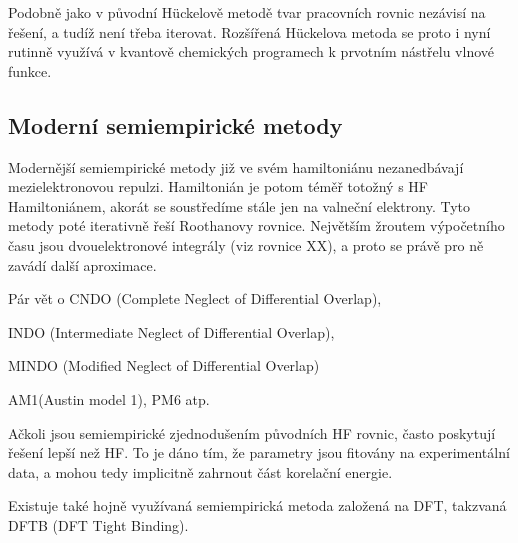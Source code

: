 Podobně jako v původní H\"{u}ckelově metodě tvar pracovních rovnic nezávisí na řešení, a tudíž není třeba iterovat. Rozšířená H\"{u}ckelova metoda se proto i nyní rutinně využívá v kvantově chemických programech k prvotním nástřelu vlnové funkce.

\subsection{Moderní semiempirické metody}

Modernější semiempirické metody již ve svém hamiltoniánu nezanedbávají mezielektronovou repulzi.
Hamiltonián je potom téměř totožný s HF Hamiltoniánem, akorát se soustředíme stále jen na valneční elektrony. Tyto metody poté iterativně řeší Roothanovy rovnice. Největším žroutem výpočetního času jsou dvouelektronové integrály (viz rovnice XX), a proto se právě pro ně zavádí další aproximace.
 
 Pár vět o CNDO (Complete Neglect of Differential Overlap),
 
 INDO (Intermediate Neglect of Differential Overlap),
 
 MINDO (Modified Neglect of Differential Overlap)
 
 AM1(Austin model 1), PM6 atp.

Ačkoli jsou semiempirické zjednodušením původních HF rovnic, často poskytují řešení lepší než HF.
To je dáno tím, že parametry jsou fitovány na experimentální data, a mohou tedy implicitně zahrnout část korelační energie.

Existuje také hojně využívaná semiempirická metoda založená na DFT, takzvaná DFTB (DFT Tight Binding).


 